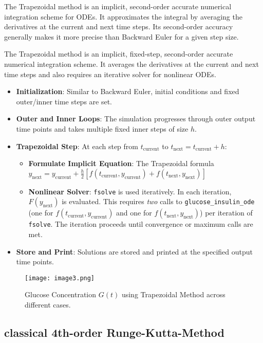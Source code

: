 \documentclass[conference]{IEEEtran}
\begin{document}
The Trapezoidal method is an implicit, second-order accurate numerical integration scheme for ODEs. It approximates the integral by averaging the derivatives at the current and next time steps. Its second-order accuracy generally makes it more precise than Backward Euler for a given step size.

The Trapezoidal method is an implicit, fixed-step, second-order accurate numerical integration scheme. It averages the derivatives at the current and next time steps and also requires an iterative solver for nonlinear ODEs.

\begin{itemize}
    \item \textbf{Initialization}: Similar to Backward Euler, initial conditions and fixed outer/inner time steps are set.
    \item \textbf{Outer and Inner Loops}: The simulation progresses through outer output time points and takes multiple fixed inner steps of size $h$.
    \item \textbf{Trapezoidal Step}: At each step from $t_{\text{current}}$ to $t_{\text{next}} = t_{\text{current}} + h$:
    \begin{itemize}
        \item \textbf{Formulate Implicit Equation}: The Trapezoidal formula $y_{\text{next}} = y_{\text{current}} + \frac{h}{2} [f(t_{\text{current}}, y_{\text{current}}) + f(t_{\text{next}}, y_{\text{next}})]$ 
        \item \textbf{Nonlinear Solver}: \texttt{fsolve} is used iteratively. In each iteration, $F(y_{\text{next}})$ is evaluated. This requires \textit{two} calls to \texttt{glucose\_insulin\_ode} (one for $f(t_{\text{current}}, y_{\text{current}})$ and one for $f(t_{\text{next}}, y_{\text{next}})$) per iteration of \texttt{fsolve}. The iteration proceeds until convergence or maximum calls are met.
    \end{itemize}
    \item \textbf{Store and Print}: Solutions are stored and printed at the specified output time points.
\end{itemize}
\begin{figure}[H]
    \centering
    \texttt{[image: image3.png]}
    \caption{Glucose Concentration $G(t)$ using Trapezoidal Method across different cases.}
    \label{fig:trap_glucose}
\end{figure}




\subsection{classical 4th-order Runge-Kutta-Method}
\end{document}
